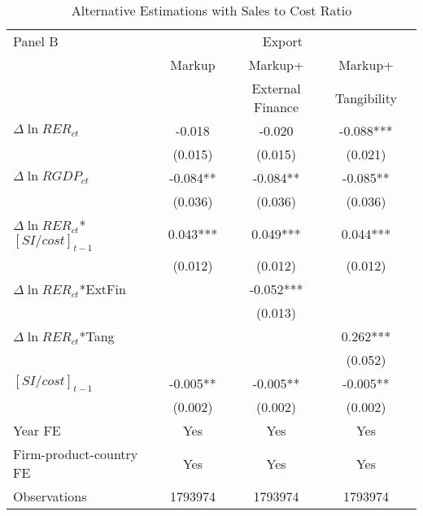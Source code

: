 \begin{table}[htbp]
	\centering
	\caption{Alternative Estimations with Sales to Cost Ratio}
	\begin{tabular}{lcccc}
		\toprule
		Panel B & \multicolumn{3}{c}{Export} \\
		& Markup & Markup+ & Markup+ \\
		&       & External Finance & Tangibility \\
		\midrule
		$\Delta \ln RER_{ct}$ & -0.018 & -0.020 & -0.088*** \\
		& (0.015) & (0.015) & (0.021) \\
		$\Delta \ln RGDP_{ct}$ & -0.084** & -0.084** & -0.085** \\
		& (0.036) & (0.036) & (0.036) \\
		$\Delta \ln RER_{ct}$*$[SI/cost]_{t-1}$ & 0.043*** & 0.049*** & 0.044*** \\
		& (0.012) & (0.012) & (0.012) \\
		$\Delta \ln RER_{ct}$*ExtFin &       & -0.052*** &  \\
		&       & (0.013) &  \\
		$\Delta \ln RER_{ct}$*Tang &       &       & 0.262*** \\
		&       &       & (0.052) \\
		$[SI/cost]_{t-1}$ & -0.005** & -0.005** & -0.005** \\
		& (0.002) & (0.002) & (0.002) \\
		Year FE  & Yes   & Yes   & Yes \\
		Firm-product-country FE & Yes   & Yes   & Yes \\
		Observations & 1793974 & 1793974 & 1793974 \\
		\bottomrule
	    \end{tabular}
	\label{tabA.4}
\end{table}